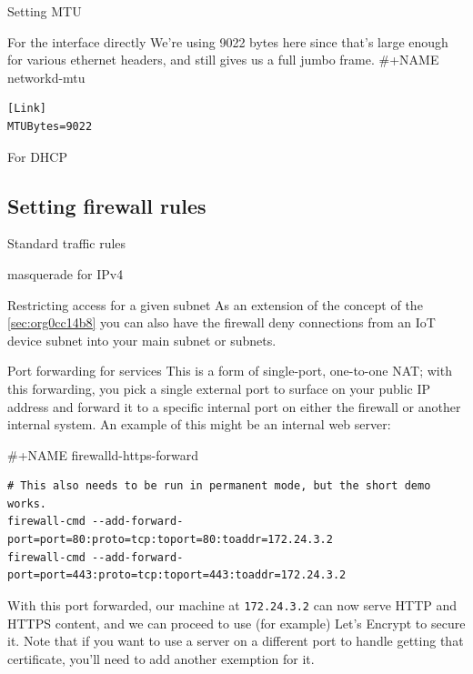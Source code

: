 \documentclass[bigger]{beamer}
\begin{document}
\begin{frame}[fragile,label={sec:orge0b857e}]{Setting MTU}
 \begin{block}{For the interface directly}
     We're using 9022 bytes here since that's large enough for various ethernet
     headers, and still gives us a full jumbo frame.
\#+NAME networkd-mtu
\begin{verbatim}
[Link]
MTUBytes=9022
\end{verbatim}
\end{block}

\begin{block}{For DHCP}
\end{block}
\end{frame}


\subsection{Setting firewall rules}
\label{sec:org6569745}

\begin{frame}[label={sec:org2862f08}]{Standard traffic rules}
\begin{block}{masquerade for IPv4}
\end{block}

\begin{block}{Restricting access for a given subnet}
As an extension of the concept of the \ref{sec:org0cc14b8} you can also
have the firewall deny connections from an IoT device subnet into your main
subnet or subnets.
\end{block}
\end{frame}

\begin{frame}[fragile,label={sec:orgc73d656}]{Port forwarding for services}
 This is a form of single-port, one-to-one NAT; with this forwarding, you
pick a single external port to surface on your public IP address and forward
it to a specific internal port on either the firewall or another internal
system. An example of this might be an internal web server:

\#+NAME firewalld-https-forward
\begin{verbatim}
# This also needs to be run in permanent mode, but the short demo works.
firewall-cmd --add-forward-port=port=80:proto=tcp:toport=80:toaddr=172.24.3.2
firewall-cmd --add-forward-port=port=443:proto=tcp:toport=443:toaddr=172.24.3.2
\end{verbatim}

With this port forwarded, our machine at \texttt{172.24.3.2} can now serve HTTP and
HTTPS content, and we can proceed to use (for example) Let's Encrypt to
secure it. Note that if you want to use a server on a different port to handle
getting that certificate, you'll need to add another exemption for it.
\end{frame}
\end{document}
